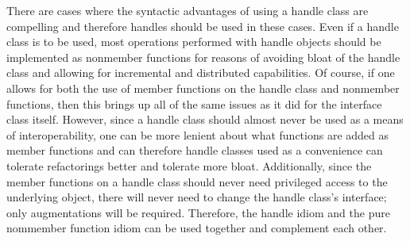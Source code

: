 \documentclass[pdf,ps2pdf,11pt]{SANDreport}
\begin{document}
There are cases where the syntactic advantages of using a handle class are
compelling and therefore handles should be used in these cases.  Even if a
handle class is to be used, most operations performed with handle objects
should be implemented as nonmember functions for reasons of avoiding bloat of
the handle class and allowing for incremental and distributed capabilities.
Of course, if one allows for both the use of member functions on the handle
class and nonmember functions, then this brings up all of the same issues as
it did for the interface class itself.  However, since a handle class should
almost never be used as a means of interoperability, one can be more lenient
about what functions are added as member functions and can therefore handle
classes used as a convenience can tolerate refactorings better and tolerate
more bloat.  Additionally, since the member functions on a handle class should
never need privileged access to the underlying object, there will never need
to change the handle class's interface; only augmentations will be required.
Therefore, the handle idiom and the pure nommember function idiom can be used
together and complement each other.

\end{document}
